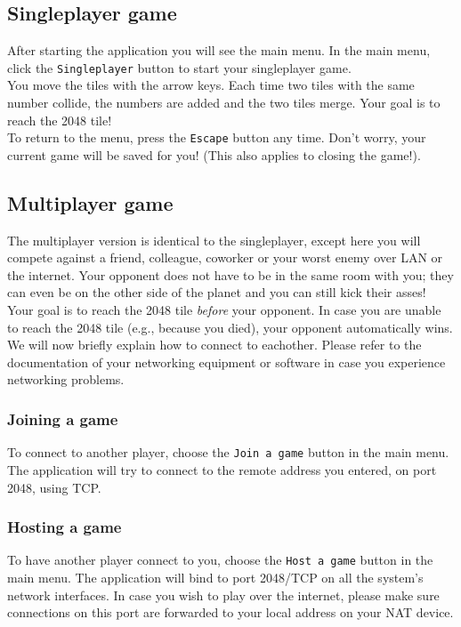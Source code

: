 \documentclass[a4paper,11pt,report]{scrartcl}
\begin{document}
\subsection{Singleplayer game}
After starting the application you will see the main menu. In the main menu,
click the \texttt{Singleplayer} button to start your singleplayer game.\\

You move the tiles with the arrow keys. Each time two tiles with the same
number collide, the numbers are added and the two tiles merge. Your goal is to
reach the 2048 tile!\\

To return to the menu, press the \texttt{Escape} button any time. Don't worry,
your current game will be saved for you! (This also applies to closing the
game!).

\subsection{Multiplayer game}
The multiplayer version is identical to the singleplayer, except here you will
compete against a friend, colleague, coworker or your worst enemy over LAN or
the internet. Your opponent does not have to be in the same room with you; they
can even be on the other side of the planet and you can still kick their
asses!\\

Your goal is to reach the 2048 tile \textit{before} your opponent. In case you
are unable to reach the 2048 tile (e.g., because you died), your opponent
automatically wins.\\

We will now briefly explain how to connect to eachother. Please refer to the
documentation of your networking equipment or software in case you experience
networking problems.

\subsubsection{Joining a game}
To connect to another player, choose the \texttt{Join a game} button in the
main menu. The application will try to connect to the remote address you
entered, on port 2048, using TCP.

\subsubsection{Hosting a game}
To have another player connect to you, choose the \texttt{Host a game} button
in the main menu. The application will bind to port 2048/TCP on all the
system's network interfaces. In case you wish to play over the internet,
please make sure connections on this port are forwarded to your local address
on your NAT device.
\end{document}
